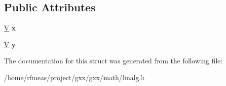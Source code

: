\subsection*{Public Attributes}
\begin{DoxyCompactItemize}
\item 
\hyperlink{structlinalg_1_1vec}{V} {\bfseries x}\hypertarget{structlinalg_1_1mat_3_01T_00_01M_00_012_01_4_a5f10bf01daa27a24fe30a1f7f36d0b62}{}\label{structlinalg_1_1mat_3_01T_00_01M_00_012_01_4_a5f10bf01daa27a24fe30a1f7f36d0b62}

\item 
\hyperlink{structlinalg_1_1vec}{V} {\bfseries y}\hypertarget{structlinalg_1_1mat_3_01T_00_01M_00_012_01_4_a4d05aee130d8873592d5e1fa12bca070}{}\label{structlinalg_1_1mat_3_01T_00_01M_00_012_01_4_a4d05aee130d8873592d5e1fa12bca070}

\end{DoxyCompactItemize}


The documentation for this struct was generated from the following file\+:\begin{DoxyCompactItemize}
\item 
/home/rfmeas/project/gxx/gxx/math/linalg.\+h\end{DoxyCompactItemize}
